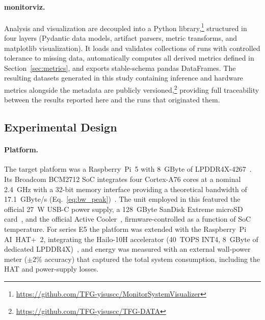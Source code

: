 \documentclass[acmsmall,natbib=false]{acmart}
\begin{document}
\paragraph{monitorviz.}
Analysis and visualization are decoupled into a Python
library,\footnote{\url{https://github.com/TFG-yisuscc/MonitorSystemVisualizer}}
structured in four layers (Pydantic data models, artifact parsers, metric
transforms, and matplotlib visualization). It loads and validates collections of
runs with controlled tolerance to missing data, automatically computes all derived metrics
defined in Section~\ref{sec:metrics}, and exports stable-schema pandas
DataFrames. The resulting datasets generated in this study containing inference and hardware metrics alongside the metadata are publicly
versioned,\footnote{\url{https://github.com/TFG-yisuscc/TFG-DATA}} providing
full traceability between the results reported here and the runs that
originated them.

\subsection{Experimental Design}\label{sec:design}

\paragraph{Platform.}
The target platform was a Raspberry~Pi~5 with 8~GByte of
LPDDR4X-4267~\cite{RPi5ProductBrief2026}. Its Broadcom BCM2712 SoC integrates
four Cortex-A76 cores at a nominal 2.4~GHz with a 32-bit memory interface
providing a theoretical bandwidth of 17.1~GByte/s
(Eq.~\eqref{eq:bw_peak})~\cite{BCM2712Doc}. The unit employed in this featured
the official 27~W USB-C power supply, a 128~GByte SanDisk Extreme microSD
card~\cite{SanDiskExtreme128}, and the
official Active Cooler~\cite{RPiActiveCooler2024}, firmware-controlled as a
function of SoC temperature. For series E5 the platform was extended with the Raspberry~Pi
AI~HAT+~2, integrating the Hailo-10H accelerator (40~TOPS INT4, 8~GByte of
dedicated LPDDR4X)~\cite{raspberrypi_ai_hat_plus_2_product_brief}, and energy
was measured with an external wall-power meter ($\pm2\%$ accuracy) that
captured the total system consumption, including the HAT and power-supply losses.
\end{document}
